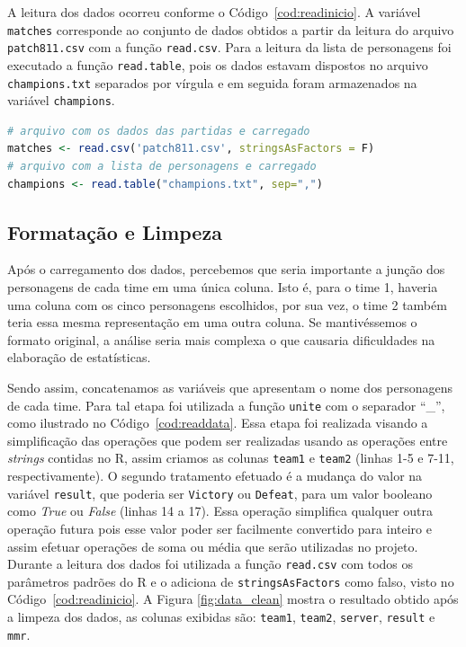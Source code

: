 \documentclass[a4paper]{article}
\begin{document}
A leitura dos dados ocorreu conforme o Código~\ref{cod:readinicio}. A variável \texttt{matches} corresponde ao conjunto de dados obtidos a partir da leitura do arquivo \texttt{patch811.csv} com a função \texttt{read.csv}. Para a leitura da lista de personagens foi executado a função \texttt{read.table}, pois os dados estavam dispostos no arquivo \texttt{champions.txt} separados por vírgula e em seguida foram armazenados na variável \texttt{champions}.

\begin{lstlisting}[language=R, caption={Leitura da 
base de dados original},label={cod:readinicio}]
# arquivo com os dados das partidas e carregado
matches <- read.csv('patch811.csv', stringsAsFactors = F)
# arquivo com a lista de personagens e carregado
champions <- read.table("champions.txt", sep=",")
\end{lstlisting}

\subsection{Formatação e Limpeza}
\label{sec:limpeza}

Após o carregamento dos dados, percebemos que seria importante a junção dos personagens de cada time em uma única coluna. Isto é, para o time 1, haveria uma coluna com os cinco personagens escolhidos, por sua vez, o time 2 também teria essa mesma representação em uma outra coluna. Se mantivéssemos o formato original, a análise seria mais complexa o que causaria dificuldades na elaboração de estatísticas.  

Sendo assim, concatenamos as variáveis que apresentam o nome dos personagens de cada time. Para tal etapa foi utilizada a função \texttt{unite} com o separador “\_”, como ilustrado no Código~\ref{cod:readdata}. Essa etapa foi realizada visando a simplificação das operações que podem ser realizadas usando as operações entre \textit{strings} contidas no R, assim criamos as colunas \texttt{team1} e \texttt{team2} (linhas 1-5 e 7-11, respectivamente). O segundo tratamento efetuado é a mudança do valor na variável \texttt{result}, que poderia ser \texttt{Victory} ou \texttt{Defeat}, para um valor booleano como \textit{True} ou \textit{False} (linhas 14 a 17). Essa operação simplifica qualquer outra operação futura pois esse valor poder ser facilmente convertido para inteiro e assim efetuar operações de soma ou média que serão utilizadas no projeto. Durante a leitura dos dados foi utilizada a função \texttt{read.csv} com todos os parâmetros padrões do R e o adiciona de \texttt{stringsAsFactors} como falso, visto no Código~\ref{cod:readinicio}. A Figura \ref{fig:data_clean} mostra o resultado obtido após a limpeza dos dados, as colunas exibidas são: \texttt{team1}, \texttt{team2}, \texttt{server}, \texttt{result} e \texttt{mmr}.
\end{document}
